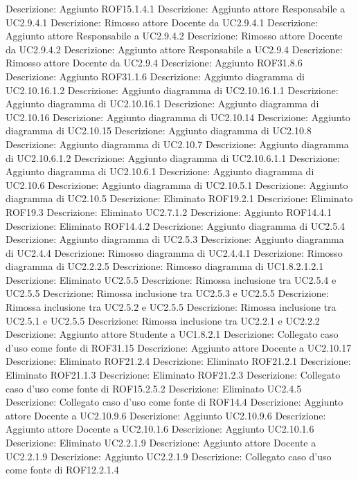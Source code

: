 Descrizione: Aggiunto ROF15.1.4.1 
Descrizione: Aggiunto attore Responsabile a UC2.9.4.1 
Descrizione: Rimosso attore Docente da UC2.9.4.1 
Descrizione: Aggiunto attore Responsabile a UC2.9.4.2 
Descrizione: Rimosso attore Docente da UC2.9.4.2 
Descrizione: Aggiunto attore Responsabile a UC2.9.4 
Descrizione: Rimosso attore Docente da UC2.9.4 
Descrizione: Aggiunto ROF31.8.6 
Descrizione: Aggiunto ROF31.1.6 
Descrizione: Aggiunto diagramma di UC2.10.16.1.2 
Descrizione: Aggiunto diagramma di UC2.10.16.1.1 
Descrizione: Aggiunto diagramma di UC2.10.16.1 
Descrizione: Aggiunto diagramma di UC2.10.16 
Descrizione: Aggiunto diagramma di UC2.10.14 
Descrizione: Aggiunto diagramma di UC2.10.15 
Descrizione: Aggiunto diagramma di UC2.10.8 
Descrizione: Aggiunto diagramma di UC2.10.7 
Descrizione: Aggiunto diagramma di UC2.10.6.1.2 
Descrizione: Aggiunto diagramma di UC2.10.6.1.1 
Descrizione: Aggiunto diagramma di UC2.10.6.1 
Descrizione: Aggiunto diagramma di UC2.10.6 
Descrizione: Aggiunto diagramma di UC2.10.5.1 
Descrizione: Aggiunto diagramma di UC2.10.5 
Descrizione: Eliminato ROF19.2.1 
Descrizione: Eliminato ROF19.3 
Descrizione: Eliminato UC2.7.1.2 
Descrizione: Aggiunto ROF14.4.1 
Descrizione: Eliminato ROF14.4.2 
Descrizione: Aggiunto diagramma di UC2.5.4 
Descrizione: Aggiunto diagramma di UC2.5.3 
Descrizione: Aggiunto diagramma di UC2.4.4 
Descrizione: Rimosso diagramma di UC2.4.4.1 
Descrizione: Rimosso diagramma di UC2.2.2.5 
Descrizione: Rimosso diagramma di UC1.8.2.1.2.1 
Descrizione: Eliminato UC2.5.5 
Descrizione: Rimossa inclusione tra UC2.5.4 e UC2.5.5 
Descrizione: Rimossa inclusione tra UC2.5.3 e UC2.5.5 
Descrizione: Rimossa inclusione tra UC2.5.2 e UC2.5.5 
Descrizione: Rimossa inclusione tra UC2.5.1 e UC2.5.5 
Descrizione: Rimossa inclusione tra UC2.2.1 e UC2.2.2 
Descrizione: Aggiunto attore Studente a UC1.8.2.1 
Descrizione: Collegato caso d'uso  come fonte di ROF31.15 
Descrizione: Aggiunto attore Docente a UC2.10.17 
Descrizione: Eliminato ROF21.2.4 
Descrizione: Eliminato ROF21.2.1 
Descrizione: Eliminato ROF21.1.3 
Descrizione: Eliminato ROF21.2.3 
Descrizione: Collegato caso d'uso  come fonte di ROF15.2.5.2 
Descrizione: Eliminato UC2.4.5 
Descrizione: Collegato caso d'uso  come fonte di ROF14.4 
Descrizione: Aggiunto attore Docente a UC2.10.9.6 
Descrizione: Aggiunto UC2.10.9.6 
Descrizione: Aggiunto attore Docente a UC2.10.1.6 
Descrizione: Aggiunto UC2.10.1.6 
Descrizione: Eliminato UC2.2.1.9 
Descrizione: Aggiunto attore Docente a UC2.2.1.9 
Descrizione: Aggiunto UC2.2.1.9 
Descrizione: Collegato caso d'uso  come fonte di ROF12.2.1.4 
